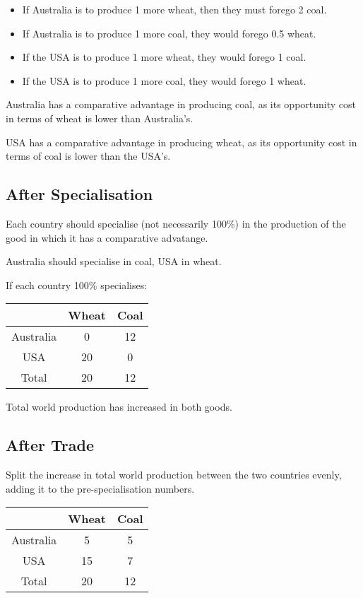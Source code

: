\documentclass[a4paper,11pt]{article}
\begin{document}
\begin{itemize}
\item If Australia is to produce 1 more wheat, then they must forego 2 coal.
\item If Australia is to produce 1 more coal, they would forego 0.5 wheat.
\item If the USA is to produce 1 more wheat, they would forego 1 coal.
\item If the USA is to produce 1 more coal, they would forego 1 wheat.
\end{itemize}

Australia has a comparative advantage in producing coal, as its opportunity
cost in terms of wheat is lower than Australia's.

USA has a comparative advantage in producing wheat, as its opportunity cost in
terms of coal is lower than the USA's.


\subsection{After Specialisation}

Each country should specialise (not necessarily 100\%) in the production of the
good in which it has a comparative advatange.

Australia should specialise in coal, USA in wheat.

If each country 100\% specialises:

\begin{center}
\begin{tabular}{c|c|c}
& Wheat & Coal \\
\hline
Australia & 0  & 12 \\
USA       & 20 & 0  \\
Total     & 20 & 12 \\
\end{tabular}
\end{center}

Total world production has increased in both goods.


\subsection{After Trade}

Split the increase in total world production between the two countries evenly,
adding it to the pre-specialisation numbers.

\begin{center}
\begin{tabular}{c|c|c}
& Wheat & Coal \\
\hline
Australia & 5  & 5  \\
USA       & 15 & 7  \\
Total     & 20 & 12 \\
\end{tabular}
\end{center}
\end{document}

